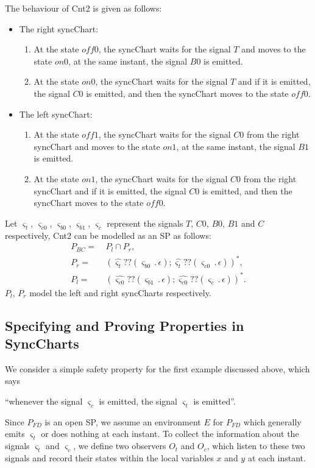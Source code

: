 \documentclass{fcs}
\newcommand{\sig}[0]{\varsigma}
\DeclareMathOperator{\seq}{;}
\DeclareMathOperator{\para}{\cap}
\DeclareMathOperator{\nex}{.}
\begin{document}
The behaviour of Cnt2 is given as follows:
\begin{itemize}
    \item The right syncChart:
        \begin{enumerate}[(1)]
            \item At the state $\mathit{off0}$, the syncChart waits for the signal $T$ and moves to the state $\mathit{on0}$, at the same instant, the signal $B0$ is emitted.
            \item At the state $\mathit{on0}$, the syncChart waits for the signal $T$ and if it is emitted, the signal $C0$ is emitted, and then the syncChart moves to the state $\mathit{off0}$.
        \end{enumerate}
    \item The left syncChart:
        \begin{enumerate}[(1)]
            \item At the state $\mathit{off1}$, the syncChart waits for the signal $C0$ from the right syncChart and moves to the state $\mathit{on1}$, at the same instant, the signal $B1$ is emitted.
            \item At the state $\mathit{on1}$, the syncChart waits for the signal $C0$ from the right syncChart and if it is emitted, the signal $C0$ is emitted, and then the syncChart moves to the state $\mathit{off0}$.
        \end{enumerate}
\end{itemize}
Let $\sig_t$, $\sig_{c0}$, $\sig_{b0}$, $\sig_{b1}$, $\sig_{c}$ represent the signals $T$, $C0$, $B0$, $B1$  and $C$ respectively, Cnt2 can be modelled as an SP as follows:
$$
\begin{aligned}
P_{\mathit{BC}} =&\ P_l\para P_r, \\
P_r =&\ (\hat{\sig_{t}}?? (\sig_{b0}\nex \epsilon) \seq \hat{\sig_{t}}?? (\sig_{c0}\nex \epsilon))^*,\\
P_l =&\ (\hat{\sig_{c0}}?? (\sig_{b1}\nex \epsilon) \seq \hat{\sig_{c0}}?? (\sig_{c}\nex \epsilon))^*.
\end{aligned}
$$
$P_l$, $P_r$ model the left and right syncCharts respectively.

\subsection{Specifying and Proving Properties in SyncCharts}
\label{section:Specifying and Proving Properties in SyncCharts}

We consider a simple safety property for the first example discussed above, which says
\begin{center}``whenever the signal $\sig_c$ is emitted, the signal $\sig_t$ is emitted''.\end{center}
Since $P_{\mathit{FD}}$ is an open SP, we assume an environment $E$ for $P_{\mathit{FD}}$ which generally emits $\sig_t$ or does nothing at each instant.
To collect the information about the signals $\sig_t$ and $\sig_c$, we define two observers $O_t$ and $O_c$, which listen to these two signals and record their states within the local variables
$x$ and $y$ at each instant.
\end{document}
